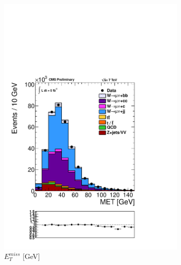 \begin{figure}[hb]
\centering
  \begin{subfigure}[b]{.45\textwidth}
	\includegraphics[trim = 0mm 52mm 0mm 0mm, clip,width=\textwidth]{images/met.pdf}
	\caption[]{$E_{T}^{miss}$ [GeV]}
	\end{subfigure}	
   \begin{subfigure}[b]{.45\textwidth}

\end{subfigure}
\end{figure}
